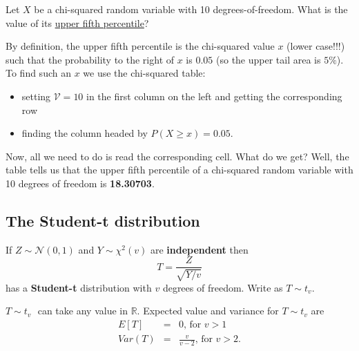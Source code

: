 \documentclass[smaller]{beamer}\usepackage[]{graphicx}\usepackage[]{color}
\newcommand{\N}{\mathcal{N}}
\begin{document}
\begin{frame}{\subsecname}


\begin{example}

Let $X$ be a chi-squared random variable with 10 degrees-of-freedom. What is the value of its \underline{upper fifth percentile}? \bigskip

By definition, the upper fifth percentile is the chi-squared value $x$ (lower case!!!) such that the probability to the right of $x$ is $0.05$ (so the upper tail area is $5\%$).  To find such an $x$ we use the chi-squared table: \medskip
\begin{itemize}
\item setting $\mathcal{V} = 10$ in the first column on the left and getting the corresponding row \medskip
\item finding the column headed by $P(X \geq x) = 0.05$. \medskip
\end{itemize}

Now, all we need to do is read the corresponding cell. What do we get? Well, the table tells us that the upper fifth percentile of a chi-squared random variable with 10 degrees of freedom is \textbf{18.30703}.
\end{example}
\end{frame}

\subsection{The Student-t distribution}

\begin{frame}{\subsecname}
  \begin{definition}
  If $Z\sim \N(0,1)$ and $Y\sim \chi ^{2}(v)$ are \textbf{independent}
  then%
  \begin{equation*}
  T=\frac{Z}{\sqrt{Y/v}}
  \end{equation*}%
  has a \textbf{Student-t} distribution with $v$ degrees of freedom. Write as $T\sim t_{v}$.
  \end{definition}
  \bigskip
  $T\sim t_{v}\,$\ can take any value in $\mathbb{R}$. Expected value and variance for $T\sim t_{v}$ are
  \begin{eqnarray*}
  E\left[ T\right] &=&0\text{, for }v>1 \\
  Var\left( T\right) &=&\frac{v}{v-2}\text{, for }v>2.
  \end{eqnarray*}
\end{frame}
\end{document}
